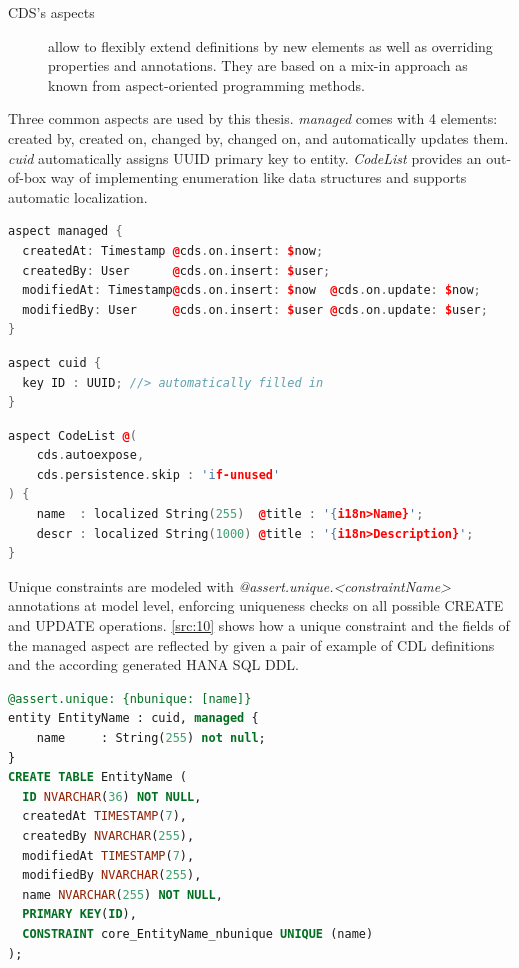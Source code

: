 \begin{description}
    \item[CDS's aspects] allow to flexibly extend definitions by new elements as well as overriding properties and annotations. They are based on a mix-in approach as known from aspect-oriented programming methods. \cite{cap-cds-common-aspects}
\end{description}

Three common aspects are used by this thesis. \textit{managed} comes with 4 elements: created by, created on, changed by, changed on, and automatically updates them. \textit{cuid} automatically assigns UUID primary key to entity. \textit{CodeList} provides an out-of-box way of implementing enumeration like data structures and supports automatic localization.

\begin{lstlisting}[language={c++}]
aspect managed {
  createdAt: Timestamp @cds.on.insert: $now;
  createdBy: User      @cds.on.insert: $user;
  modifiedAt: Timestamp@cds.on.insert: $now  @cds.on.update: $now;
  modifiedBy: User     @cds.on.insert: $user @cds.on.update: $user;
}
\end{lstlisting}

\begin{lstlisting}[language={c++}]
aspect cuid {
  key ID : UUID; //> automatically filled in
}
\end{lstlisting}

\begin{lstlisting}[language={c++}]
aspect CodeList @(
    cds.autoexpose,
    cds.persistence.skip : 'if-unused'
) {
    name  : localized String(255)  @title : '{i18n>Name}';
    descr : localized String(1000) @title : '{i18n>Description}';
}
\end{lstlisting}

Unique constraints are modeled with \textit{@assert.unique.<constraintName>} annotations \cite{cap-cds-common-annotations} at model level, enforcing uniqueness checks on all possible CREATE and UPDATE operations.
\autoref{src:10} shows how a unique constraint and the fields of the managed aspect are reflected by given a pair of example of CDL definitions and the according generated HANA SQL DDL.

\begin{lstlisting}[language={sql}]
@assert.unique: {nbunique: [name]}
entity EntityName : cuid, managed {
    name     : String(255) not null;
}
CREATE TABLE EntityName (
  ID NVARCHAR(36) NOT NULL,
  createdAt TIMESTAMP(7),
  createdBy NVARCHAR(255),
  modifiedAt TIMESTAMP(7),
  modifiedBy NVARCHAR(255),
  name NVARCHAR(255) NOT NULL,
  PRIMARY KEY(ID),
  CONSTRAINT core_EntityName_nbunique UNIQUE (name)
); 
\end{lstlisting}


